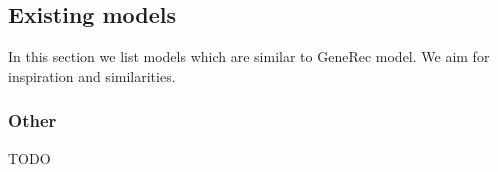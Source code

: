 \subsection{Existing models}

In this section we list models which are similar to GeneRec model. We aim for inspiration and similarities. 













\subsubsection{Other}
TODO


